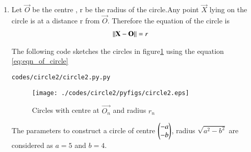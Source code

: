 \renewcommand{\theequation}{\theenumi}
\begin{enumerate}[label=\thesection.\arabic*.,ref=\thesection.\theenumi]

\item Let $\vec{O}$ be the centre , r be the radius of the circle.Any point $\vec{X}$ lying on the circle is at a distance r from $\vec{O}$.
\newline
Therefore the equation of the circle is 
\begin{align}
\left\lVert\mathbf{X}-\mathbf{O}\right\rVert &=r
\label{eq:eqn_of_circle}
\end{align}


The following code sketches the circles in figure\ref{fig:circle2} using the equation \ref{eq:eqn_of_circle}
\begin{lstlisting}
codes/circle2/circle2.py.py
\end{lstlisting}
\begin{figure}[!ht]
\centering
\texttt{[image: ./codes/circle2/pyfigs/circle2.eps]}
\caption{Circles with centre at $\vec{O_n}$ and radius $r_n$}
\label{fig:circle2}
\end{figure}
The parameters to construct a circle of centre $\begin{pmatrix}-a\\-b\end{pmatrix}$, radius $\sqrt{a^2-b^2}$ are considered as $a=5$ and $b=4$.
\end{enumerate}
